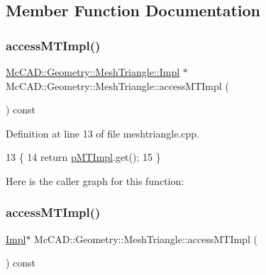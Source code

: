 \subsection{Member Function Documentation}
\mbox{\label{classMcCAD_1_1Geometry_1_1MeshTriangle_abd8b4e7b4f1dc5da17651c741bc6fada}} 
\subsubsection{\texorpdfstring{access\+M\+T\+Impl()}{accessMTImpl()}\hspace{0.1cm}{\footnotesize\ttfamily [1/2]}}
{\footnotesize\ttfamily \hyperlink{classMcCAD_1_1Geometry_1_1MeshTriangle_1_1Impl}{Mc\+C\+A\+D\+::\+Geometry\+::\+Mesh\+Triangle\+::\+Impl} $\ast$ Mc\+C\+A\+D\+::\+Geometry\+::\+Mesh\+Triangle\+::access\+M\+T\+Impl (\begin{DoxyParamCaption}{ }\end{DoxyParamCaption}) const}



Definition at line 13 of file meshtriangle.\+cpp.


\begin{DoxyCode}
13                                              \{
14   \textcolor{keywordflow}{return} \hyperlink{classMcCAD_1_1Geometry_1_1MeshTriangle_a1e7fcfc7c77cdeae2d25a8a989a53d09}{pMTImpl}.get();
15 \}
\end{DoxyCode}
Here is the caller graph for this function\+:
\mbox{\label{classMcCAD_1_1Geometry_1_1MeshTriangle_abe51f006f2e495583a18f28570778c4a}} 
\subsubsection{\texorpdfstring{access\+M\+T\+Impl()}{accessMTImpl()}\hspace{0.1cm}{\footnotesize\ttfamily [2/2]}}
{\footnotesize\ttfamily \hyperlink{classMcCAD_1_1Geometry_1_1MeshTriangle_1_1Impl}{Impl}$\ast$ Mc\+C\+A\+D\+::\+Geometry\+::\+Mesh\+Triangle\+::access\+M\+T\+Impl (\begin{DoxyParamCaption}{ }\end{DoxyParamCaption}) const}



